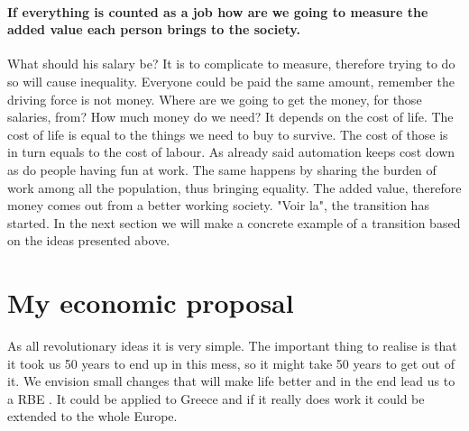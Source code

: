 \documentclass{article}
\begin{document}
\paragraph{If everything is counted as a job how are we going to measure the added value each person brings to the society.}
What should his salary be?
It is to complicate to measure, therefore trying to do so will cause inequality.
Everyone could be paid the same amount, remember the driving force is not money.
Where are we going to get the money, for those salaries, from?
How much money do we need?
It depends on the cost of life.
The cost of life is equal to the things we need to buy to survive.
The cost of those is in turn equals to the cost of labour.
As already said automation keeps cost down as do people having fun at work.
The same happens by sharing the burden of work among all the population, thus bringing equality.
The added value, therefore money comes out from a better working society.
"Voir la", the transition has started.
In the next section we will make a concrete example of a transition based on the ideas presented above.

\section{My economic proposal}
\label{sec:economic}
As all revolutionary ideas it is very simple.
The important thing to realise is that it took us 50 years to end up in this mess, so it might take 50 years to get out of it.
We envision small changes that will make life better and in the end lead us to a RBE \cite{rbe}.
It could be applied to Greece and if it really does work it could be extended to the whole Europe.
\end{document}
